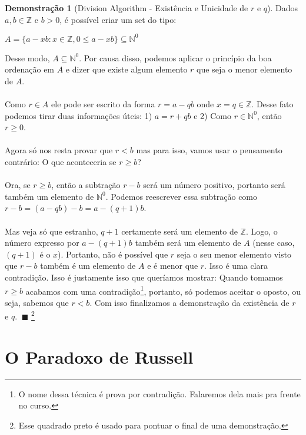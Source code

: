 \documentclass[a4paper,11pt]{book}
\theoremstyle{definition}
\theoremstyle{break}
\newtheorem{demonstration}{Demonstração}[section]
\begin{document}
\begin{demonstration}[\small Division Algorithm - Existência e Unicidade de $r$ e $q$]
Dados $a,b \in \mathbb{Z}$ e $b > 0$, é possível criar um set do tipo:
\begin{center}
	$ A = \{ a - xb : x \in \mathbb{Z}, 0 \leq a - xb \} \subseteq \mathbb{N}^0 $
\end{center}
Desse modo, $A \subseteq \mathbb{N}^0$. Por causa disso, podemos aplicar o princípio da boa ordenação em $A$ e dizer que existe algum elemento $r$ que seja o menor elemento de $A$.
\\
\\
Como $r \in A$ ele pode ser escrito da forma $r = a - qb$ onde $x = q \in \mathbb{Z}$. Desse fato podemos tirar duas informações úteis: 1) $a = r + qb$ e 2) Como $r \in \mathbb{N}^0$, então $r \geq 0$.
\\
\\
Agora só nos resta provar que $r < b$ mas para isso, vamos usar o pensamento contrário: O que aconteceria se $r \geq b$?
\\
\\
Ora, se $r \geq b$, então a subtração $r - b$ será um número positivo, portanto será também um elemento de $\mathbb{N}^0$. Podemos reescrever essa subtração como $r - b = (a - qb) - b = a - (q + 1)b$. 
\\
\\
Mas veja só que estranho, $q + 1$ certamente será um elemento de $\mathbb{Z}$. Logo, o número expresso por $a - (q + 1)b$ também será um elemento de $A$ (nesse caso, $(q + 1)$ é o $x$). Portanto, não é possível que $r$ seja o seu menor elemento visto que $r - b$ também é um elemento de $A$ e é menor que $r$. Isso é uma clara contradição. Isso é justamente isso que queríamos mostrar: Quando tomamos $r \geq b$ acabamos com uma contradição\footnote{O nome dessa técnica é prova por contradição. Falaremos dela mais pra frente no curso.}, portanto, só podemos aceitar o oposto, ou seja, sabemos que $r < b$. Com isso finalizamos a demonstração da existência de $r$ e $q$. $\ \blacksquare$ \footnote{Esse quadrado preto é usado para pontuar o final de uma demonstração.}
\end{demonstration}


\section{O Paradoxo de Russell}
\end{document}

